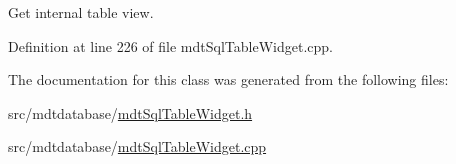Get internal table view. 



Definition at line 226 of file mdt\-Sql\-Table\-Widget.\-cpp.



The documentation for this class was generated from the following files\-:\begin{DoxyCompactItemize}
\item 
src/mdtdatabase/\hyperlink{mdt_sql_table_widget_8h}{mdt\-Sql\-Table\-Widget.\-h}\item 
src/mdtdatabase/\hyperlink{mdt_sql_table_widget_8cpp}{mdt\-Sql\-Table\-Widget.\-cpp}\end{DoxyCompactItemize}
